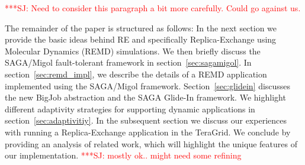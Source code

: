 \documentclass{rspublic}
\newcommand{\jhanote}[1]{ {\textcolor{red} { ***SJ: #1 }}}
\newcommand{\jhanote}[1]{}
\begin{document}
        
\jhanote{Need to consider this paragraph a bit more carefully. Could
  go against us.}         


The remainder of the paper is structured as follows: In the next
section we provide the basic ideas behind RE and specifically
Replica-Exchange using Molecular Dynamics (REMD) simulations.  We then
briefly discuss the SAGA/Migol fault-tolerant framework in
section~\ref{sec:sagamigol}.  In section~\ref{sec:remd_impl}, we
describe the details of a REMD application implemented using the
SAGA/Migol framework. Section~\ref{sec:glidein} discusses the new 
BigJob abstraction and the SAGA Glide-In framework. 
We highlight different adaptivity
strategies for supporting dynamic applications in
section~\ref{sec:adaptivitiy}.  In the subsequent section we discuss
our experiences with running a Replica-Exchange application in the
TeraGrid.  We conclude by providing an analysis of related
work, which will highlight the unique features of our implementation.
\jhanote{mostly ok.. might need some refining}
\end{document}

